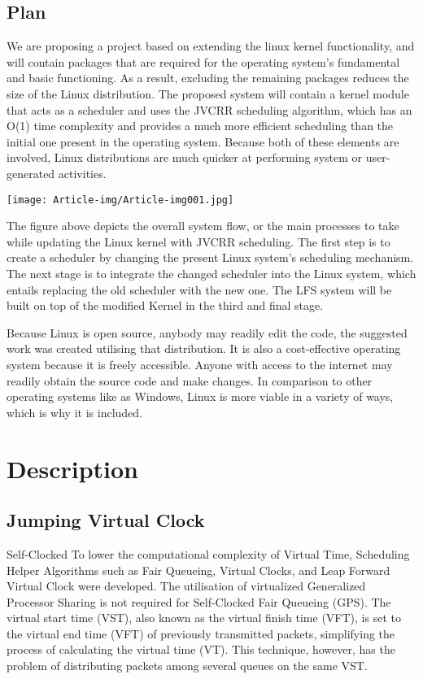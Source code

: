 \subsection{Plan}
We are proposing a project based on extending the linux kernel functionality, and will contain packages that are required for the operating system's fundamental and basic functioning. As a result, excluding the remaining packages reduces the size of the Linux distribution. The proposed system will contain a kernel module that acts as a scheduler and uses the JVCRR scheduling algorithm, which has an O(1) time complexity and provides a much more efficient scheduling than the initial one present in the operating system. Because both of these elements are involved, Linux distributions are much quicker at performing system or user-generated activities.

 \texttt{[image: Article-img/Article-img001.jpg]} 

The figure above depicts the overall system flow, or the main processes to take while updating the Linux kernel with JVCRR scheduling. The first step is to create a scheduler by changing the present Linux system's scheduling mechanism. The next stage is to integrate the changed scheduler into the Linux system, which entails replacing the old scheduler with the new one. The LFS system will be built on top of the modified Kernel in the third and final stage.

Because Linux is open source, anybody may readily edit the code, the suggested work was created utilising that distribution. It is also a cost-effective operating system because it is freely accessible. Anyone with access to the internet may readily obtain the source code and make changes. In comparison to other operating systems like as Windows, Linux is more viable in a variety of ways, which is why it is included.

\section{Description}
\subsection{Jumping Virtual Clock}
Self-Clocked To lower the computational complexity of Virtual Time, Scheduling Helper Algorithms such as Fair Queueing, Virtual Clocks, and Leap Forward Virtual Clock were developed. The utilisation of virtualized Generalized Processor Sharing is not required for Self-Clocked Fair Queueing (GPS). The virtual start time (VST), also known as the virtual finish time (VFT), is set to the virtual end time (VFT) of previously transmitted packets, simplifying the process of calculating the virtual time (VT). This technique, however, has the problem of distributing packets among several queues on the same VST.

